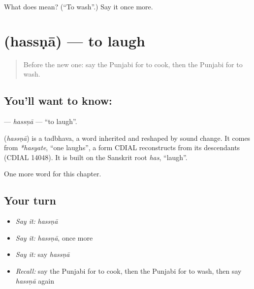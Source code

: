 \begin{tcolorbox}[breakable,colback=teal!4,colframe=teal!35!black,title={Before you move on}]
What does  mean? (\textquotedblleft{}To wash\textquotedblright{}.) Say it once more.
\end{tcolorbox}
\section[\texorpdfstring{\pa{ਹੱਸਣਾ} (hassṇā)}{ਹੱਸਣਾ (hassṇā)}]{ (hassṇā) — to laugh}

\label{lesson:PA-C59-hassna}



\begin{quote}
Before the new one: say the Punjabi for to cook, then the Punjabi for to wash.
\end{quote}

\subsection*{You'll want to know: }
\textbf{} — \emph{hassṇā} — \textquotedblleft{}to laugh\textquotedblright{}.

\begin{cousinweb}
\textbf{} (\emph{hassṇā}) is a tadbhava, a word inherited and reshaped by sound change. It comes from \emph{*hasyate}, \textquotedblleft{}one laughs\textquotedblright{}, a form CDIAL reconstructs from its descendants (CDIAL 14048). It is built on the Sanskrit root \emph{has}, \textquotedblleft{}laugh\textquotedblright{}.
\end{cousinweb}

\begin{grammarlens}[title={What you've built}]
One more word for this chapter.
\end{grammarlens}

\subsection*{Your turn}
\begin{itemize}
\raggedright
  \item \emph{Say it:} \emph{hassṇā}
  \item \emph{Say it:} \emph{hassṇā}, once more
  \item \emph{Say it:} say \emph{hassṇā}
  \item \emph{Recall:} say the Punjabi for to cook, then the Punjabi for to wash, then say \emph{hassṇā} again
\end{itemize}

